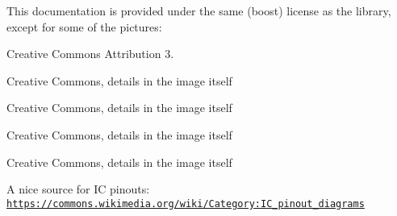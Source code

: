 This documentation is provided under the same (boost) license as the library, except for some of the pictures\+: 



 Creative Commons Attribution 3. 



 Creative Commons, details in the image itself 



 Creative Commons, details in the image itself 



 Creative Commons, details in the image itself 



 Creative Commons, details in the image itself 



A nice source for IC pinouts\+: \href{https://commons.wikimedia.org/wiki/Category:IC_pinout_diagrams}{\tt https\+://commons.\+wikimedia.\+org/wiki/\+Category\+:\+I\+C\+\_\+pinout\+\_\+diagrams} 